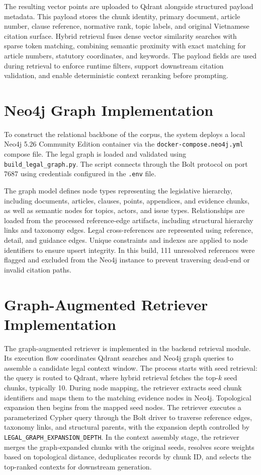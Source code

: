The resulting vector points are uploaded to Qdrant alongside structured payload metadata. This payload stores the chunk identity, primary document, article number, clause reference, normative rank, topic labels, and original Vietnamese citation surface. Hybrid retrieval fuses dense vector similarity searches with sparse token matching, combining semantic proximity with exact matching for article numbers, statutory coordinates, and keywords. The payload fields are used during retrieval to enforce runtime filters, support downstream citation validation, and enable deterministic context reranking before prompting.

\section{Neo4j Graph Implementation}
To construct the relational backbone of the corpus, the system deploys a local Neo4j 5.26 Community Edition container via the \texttt{docker-compose.neo4j.yml} compose file. The legal graph is loaded and validated using \texttt{build\_legal\_graph.py}. The script connects through the Bolt protocol on port 7687 using credentials configured in the \texttt{.env} file.

The graph model defines node types representing the legislative hierarchy, including documents, articles, clauses, points, appendices, and evidence chunks, as well as semantic nodes for topics, actors, and issue types. Relationships are loaded from the processed reference-edge artifacts, including structural hierarchy links and taxonomy edges. Legal cross-references are represented using reference, detail, and guidance edges. Unique constraints and indexes are applied to node identifiers to ensure upsert integrity. In this build, 111 unresolved references were flagged and excluded from the Neo4j instance to prevent traversing dead-end or invalid citation paths.

\section{Graph-Augmented Retriever Implementation}
The graph-augmented retriever is implemented in the backend retrieval module. Its execution flow coordinates Qdrant searches and Neo4j graph queries to assemble a candidate legal context window. The process starts with seed retrieval: the query is routed to Qdrant, where hybrid retrieval fetches the top-$k$ seed chunks, typically 10. During node mapping, the retriever extracts seed chunk identifiers and maps them to the matching evidence nodes in Neo4j. Topological expansion then begins from the mapped seed nodes. The retriever executes a parameterized Cypher query through the Bolt driver to traverse reference edges, taxonomy links, and structural parents, with the expansion depth controlled by \texttt{LEGAL\_GRAPH\_EXPANSION\_DEPTH}. In the context assembly stage, the retriever merges the graph-expanded chunks with the original seeds, resolves score weights based on topological distance, deduplicates records by chunk ID, and selects the top-ranked contexts for downstream generation.

